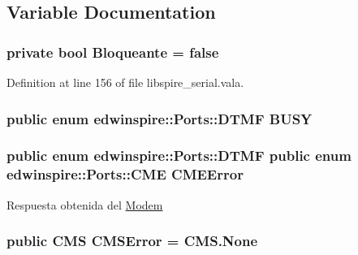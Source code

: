 \subsection{Variable Documentation}
\hypertarget{namespaceedwinspire_1_1_ports_acc08a70e547bb148eb4ecf30c82dfa2e}{
\subsubsection[{Bloqueante}]{\setlength{\rightskip}{0pt plus 5cm}private bool Bloqueante = false}}\label{namespaceedwinspire_1_1_ports_acc08a70e547bb148eb4ecf30c82dfa2e}


Definition at line 156 of file libspire\-\_\-serial.\-vala.

\hypertarget{namespaceedwinspire_1_1_ports_ab27d4ee5b5866641be5fde3f6c15719b}{
\subsubsection[{B\-U\-S\-Y}]{\setlength{\rightskip}{0pt plus 5cm}public enum {\bf edwinspire\-::\-Ports\-::\-D\-T\-M\-F}
			 B\-U\-S\-Y}}\label{namespaceedwinspire_1_1_ports_ab27d4ee5b5866641be5fde3f6c15719b}
\hypertarget{namespaceedwinspire_1_1_ports_a6e1a116e42ac0d9aa022553ffbd3d841}{
\subsubsection[{C\-M\-E\-Error}]{\setlength{\rightskip}{0pt plus 5cm}public enum {\bf edwinspire\-::\-Ports\-::\-D\-T\-M\-F} public enum {\bf edwinspire\-::\-Ports\-::\-C\-M\-E} C\-M\-E\-Error}}\label{namespaceedwinspire_1_1_ports_a6e1a116e42ac0d9aa022553ffbd3d841}


Respuesta obtenida del \hyperlink{classedwinspire_1_1_ports_1_1_modem}{Modem} 

\hypertarget{namespaceedwinspire_1_1_ports_aacf05e654cc931a34f76bbcffe360339}{
\subsubsection[{C\-M\-S\-Error}]{\setlength{\rightskip}{0pt plus 5cm}public {\bf C\-M\-S} C\-M\-S\-Error = C\-M\-S.\-None}}\label{namespaceedwinspire_1_1_ports_aacf05e654cc931a34f76bbcffe360339}


